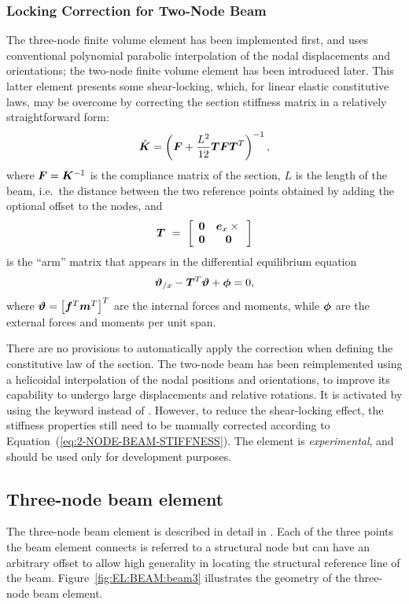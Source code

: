 \subsubsection{Locking Correction for Two-Node Beam}
The three-node finite volume element has been implemented first, 
and uses conventional polynomial parabolic interpolation 
of the nodal displacements and orientations;
the two-node finite volume element has been introduced later.
This latter element presents some shear-locking, which, for linear elastic
constitutive laws, may be overcome by correcting the section stiffness matrix
in a relatively straightforward form:
\begin{equation}\label{eq:2-NODE-BEAM-STIFFNESS}
	\hat{\T{K}} = \plbr{\T{F} + \frac{L^2}{12}\T{T} \T{F} \T{T}^T}^{-1} ,
\end{equation}
where $\T{F}=\T{K}^{-1}$ is the compliance matrix of the section, 
$L$ is the length of the beam, i.e.\ the distance between
the two reference points obtained by adding the optional offset 
to the nodes, and
\begin{displaymath}
	\T{T} \ = \ \sqbr{\matr{cc}{
		\T{0} & \T{e}_x \times{} \\
		\T{0} & \T{0}
	}}
\end{displaymath}
is the ``arm'' matrix that appears in the differential equilibrium equation
\begin{displaymath}
	\T{\vartheta}_{/x} - \T{T}^T\T{\vartheta} + \T{\phi} = 0
	,
\end{displaymath}
where $\T{\vartheta}=\sqbr{\T{f}^T \T{m}^T}^T$ are the internal forces
and moments, while $\T{\phi}$ are the external forces and moments
per unit span.

There are no provisions to automatically apply the correction 
when defining the constitutive law of the section.
The two-node beam has been reimplemented using a helicoidal interpolation
of the nodal positions and orientations, to improve its capability
to undergo large displacements and relative rotations.
It is activated by using the keyword  instead of .
However, to reduce the shear-locking effect, the stiffness properties 
still need to be manually corrected according
to Equation~(\ref{eq:2-NODE-BEAM-STIFFNESS}).
The  element is \emph{experimental}, and should be used
only for development purposes.


\subsection{Three-node beam element}
\label{sec:EL:BEAM:BEAM3}
The three-node beam element is described in detail in \cite{FV-AIAA}.
Each of the three points the beam element connects is referred
to a structural node but can have an arbitrary offset
to allow high generality in locating the structural reference line
of the beam.
Figure~\ref{fig:EL:BEAM:beam3} illustrates the geometry
of the three-node beam element.

